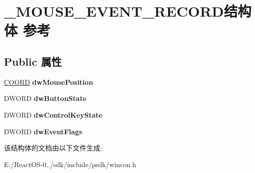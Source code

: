\hypertarget{struct___m_o_u_s_e___e_v_e_n_t___r_e_c_o_r_d}{}\section{\+\_\+\+M\+O\+U\+S\+E\+\_\+\+E\+V\+E\+N\+T\+\_\+\+R\+E\+C\+O\+R\+D结构体 参考}
\label{struct___m_o_u_s_e___e_v_e_n_t___r_e_c_o_r_d}
\subsection*{Public 属性}
\begin{DoxyCompactItemize}
\item 
\mbox{\label{struct___m_o_u_s_e___e_v_e_n_t___r_e_c_o_r_d_a5554d07c9f5f96cabb1eb6bbb9153d76}} 
\hyperlink{struct___c_o_o_r_d}{C\+O\+O\+RD} {\bfseries dw\+Mouse\+Position}
\item 
\mbox{\label{struct___m_o_u_s_e___e_v_e_n_t___r_e_c_o_r_d_a481cba4727f7e4bc44cfbf3a2087e04c}} 
D\+W\+O\+RD {\bfseries dw\+Button\+State}
\item 
\mbox{\label{struct___m_o_u_s_e___e_v_e_n_t___r_e_c_o_r_d_a02fba3b12e69cc647df9c621a1fa1631}} 
D\+W\+O\+RD {\bfseries dw\+Control\+Key\+State}
\item 
\mbox{\label{struct___m_o_u_s_e___e_v_e_n_t___r_e_c_o_r_d_a31969480d2c34834a3ca720e7169cd0c}} 
D\+W\+O\+RD {\bfseries dw\+Event\+Flags}
\end{DoxyCompactItemize}


该结构体的文档由以下文件生成\+:\begin{DoxyCompactItemize}
\item 
E\+:/\+React\+O\+S-\/0../sdk/include/psdk/wincon.\+h\end{DoxyCompactItemize}
